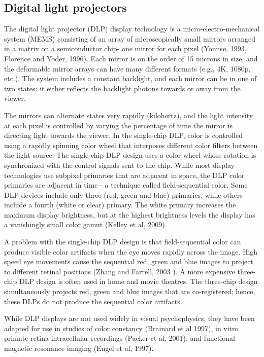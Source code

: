 \documentclass[
  letterpaper,
]{book}
\begin{document}
\subsection{Digital light projectors}\label{digital-light-projectors}

The digital light projector (DLP) display technology is a
micro-electro-mechanical system (MEMS) consisting of an array of
microscopically small mirrors arranged in a matrix on a semiconductor
chip- one mirror for each pixel (Younse, 1993, Florence and Yoder,
1996). Each mirror is on the order of 15 microns in size, and the
deformable mirror arrays can have many different formats (e.g., 4K,
1080p, etc.). The system includes a constant backlight, and each mirror
can be in one of two states: it either reflects the backlight photons
towards or away from the viewer.

The mirrors can alternate states very rapidly (kilohertz), and the light
intensity at each pixel is controlled by varying the percentage of time
the mirror is directing light towards the viewer. In the single-chip
DLP, color is controlled using a rapidly spinning color wheel that
interposes different color filters between the light source. The
single-chip DLP design uses a color wheel whose rotation is synchronized
with the control signals sent to the chip. While most display
technologies use subpixel primaries that are adjacent in space, the DLP
color primaries are adjacent in time - a technique called
field-sequential color. Some DLP devices include only three (red, green
and blue) primaries, while others include a fourth (white or clear)
primary. The white primary increases the maximum display brightness, but
at the highest brightness levels the display has a vanishingly small
color gamut (Kelley et al, 2009).

A problem with the single-chip DLP design is that field-sequential color
can produce visible color artifacts when the eye moves rapidly across
the image. High speed eye movements cause the sequential red, green and
blue images to project to different retinal positions (Zhang and
Farrell, 2003 ). A more expensive three-chip DLP design is often used in
home and movie theatres. The three-chip design simultaneously projects
red, green and blue images that are co-registered; hence, these DLPs do
not produce the sequential color artifacts.

While DLP displays are not used widely in visual psychophysics, they
have been adapted for use in studies of color constancy (Brainard et al
1997), in vitro primate retina intracellular recordings (Packer et al,
2001), and functional magnetic resonance imaging (Engel et al, 1997).
\end{document}
